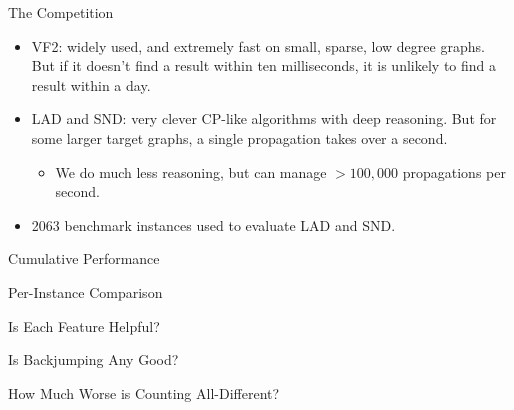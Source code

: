 \documentclass{beamer}
\begin{document}
\begin{frame}{The Competition}
    \begin{itemize}
        \item VF2: widely used, and extremely fast on small, sparse, low degree graphs. But if
            it doesn't find a result within ten milliseconds, it is unlikely to find a result
            within a day.

        \item LAD and SND: very clever CP-like algorithms with deep reasoning. But for some
            larger target graphs, a single propagation takes over a second.
            \begin{itemize}
                \item We do much less reasoning, but can manage $>100,000$ propagations per second.
            \end{itemize}

        \item 2063 benchmark instances used to evaluate LAD and SND.
    \end{itemize}
\end{frame}

\begin{frame}{Cumulative Performance}
    
\end{frame}

\begin{frame}{Per-Instance Comparison}
    
\end{frame}

\begin{frame}{Is Each Feature Helpful?}
    
\end{frame}

\begin{frame}{Is Backjumping Any Good?}
    
\end{frame}

\begin{frame}{How Much Worse is Counting All-Different?}
    
\end{frame}
\end{document}
